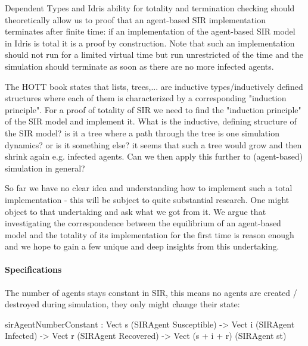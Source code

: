 Dependent Types and Idris ability for totality and termination checking should theoretically allow us to proof that an agent-based SIR implementation terminates after finite time: if an implementation of the agent-based SIR model in Idris is total it is a proof by construction. Note that such an implementation should not run for a limited virtual time but run unrestricted of the time and the simulation should terminate as soon as there are no more infected agents. 

The HOTT book \cite{program_homotopy_2013} states that lists, trees,... are inductive types/inductively defined structures where each of them is characterized by a corresponding "induction principle". For a proof of totality of SIR we need to find the "induction principle" of the SIR model and implement it. What is the inductive, defining structure of the SIR model? is it a tree where a path through the tree is one simulation dynamics? or is it something else? it seems that such a tree would grow and then shrink again e.g. infected agents. Can we then apply this further to (agent-based) simulation in general?


%
%

So far we have no clear idea and understanding how to implement such a total implementation - this will be subject to quite substantial research. One might object to that undertaking and ask what we got from it. We argue that investigating the correspondence between the equilibrium of an agent-based model and the totality of its implementation for the first time is reason enough and we hope to gain a few unique and deep insights from this undertaking.

\paragraph{Specifications}
The number of agents stays constant in SIR, this means no agents are created / destroyed during simulation, they only might change their state:
\begin{HaskellCode}
sirAgentNumberConstant : Vect s (SIRAgent Susceptible) -> 
                         Vect i (SIRAgent Infected) ->
                         Vect r (SIRAgent Recovered) -> 
                         Vect (s + i + r) (SIRAgent st)
\end{HaskellCode}

